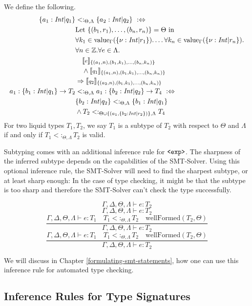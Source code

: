 \documentclass[]{scrbook}
\newcommand{\mf}[1]{\text{\texttt{#1}}}
\newcommand{\logicRule}[3]{
  \ifstrempty{#1}
  {
    \ifstrempty{#3}
    {
      \[#2\]
    }
    {
      \[\tag*{[#3]} #2\]
    }
  }
  {
    \ifstrempty{#3}
    {
      \[\dfrac{#1}{#2}\]
    }
    {
      \[\tag*{[#3]} \dfrac{#1}{#2}\]
    }
  }
  
}
\newcommand{\semantic}[1]{\llbracket \text{\footnotesize\texttt{#1}} \rrbracket}
\theoremstyle{definition}
\theoremstyle{definition}
\theoremstyle{definition}
\theoremstyle{remark}
\begin{document}
We define the following. \[
\begin{aligned}
\{a_1:\mathit{Int}| q_1 \} &<:_{\Theta,\Lambda} \{ a_2 : \mathit{Int}| q_2\} \ :\Leftrightarrow \\  &\text{Let} \ \{(b_1,r_1),\dots,(b_n,r_n)\}=\Theta \ \text{in}\\
&\forall k_1\in\text{value}_\Gamma(\{\nu:\mathit{Int}|r_1\}).\dots \forall k_n\in\text{value}_\Gamma(\{\nu:\mathit{Int}|r_n\}).\\
&\forall n\in\mathbb{Z}.\forall e \in\Lambda.\\
&\quad \semantic{$e$}_{\{(a_1,n),(b_1,k_1),\dots,(b_n,k_n)\}}\\
&\quad\land \semantic{$q_1$}_{\{(a_1,n),(b_1,k_1),\dots,(b_n,k_n)\}}\\
&\Rightarrow\semantic{$q_2$}_{\{(a_2,n),(b_1,k_1),\dots,(b_n,k_n)\}}\\
a_1:\{b_1:\mathit{Int}| q_1 \}\to T_2 &<:_{\Theta,\Lambda} a_1:\{ b_2 : \mathit{Int}| q_2\}\to T_4 \ :\Leftrightarrow\\ 
&\{ b_2 : \mathit{Int}| q_2\}<:_{\Theta,\Lambda}\{b_1:\mathit{Int}| q_1 \}\\
&\land T_2<:_{\Theta\cup\{(a_1,\{ b_2 : \mathit{Int}| r_2\})\},\Lambda} T_4
\end{aligned}
\] For two liquid types \(T_1,T_2\), we say \(T_1\) is a subtype of
\(T_2\) with respect to \(\Theta\) and \(\Lambda\) if and only if
\(T_1<:_{\Theta,\Lambda} T_2\) is valid.

Subtyping comes with an additional inference rule for \(\mf{<exp>}\).
The sharpness of the inferred subtype depends on the capabilities of the
SMT-Solver. Using this optional inference rule, the SMT-Solver will need
to find the sharpest subtype, or at least sharp enough: In the case of
type checking, it might be that the subtype is too sharp and therefore
the SMT-Solver can't check the type successfully.

\logicRule
{\Gamma,\Delta,\Theta,\Lambda\vdash e:T_1\quad
T_1<:_{\Theta,\Lambda} T_2\quad
\text{wellFormed}(T_2,\Theta)
}
{\Gamma,\Delta,\Theta,\Lambda\vdash e:T_2}
{}

We will discuss in Chapter \ref{formulating-smt-statements}, how one can
use this inference rule for automated type checking.

\subsection{Inference Rules for Type
Signatures}\label{inference-rules-for-type-signatures-1}
\end{document}
